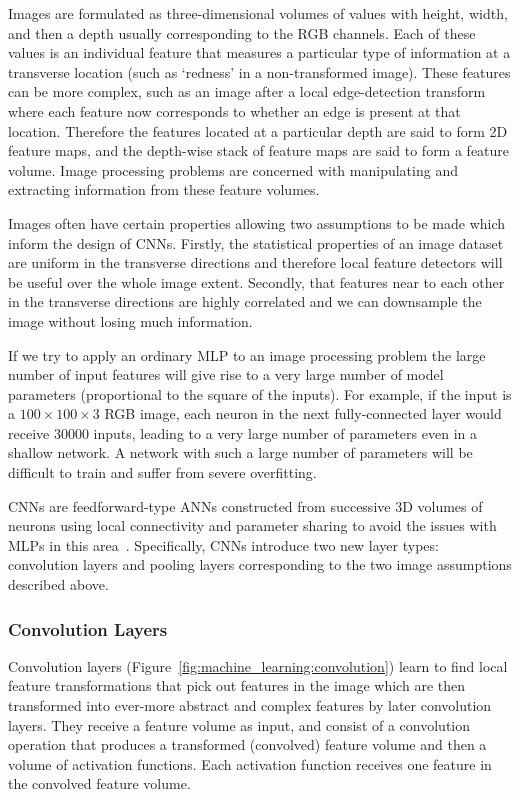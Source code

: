 Images are formulated as three-dimensional volumes of values with height, width, and then a depth usually corresponding to the RGB channels. 
Each of these values is an individual feature that measures a particular type of information at a transverse location (such as `redness' in a non-transformed image). 
These features can be more complex, such as an image after a local edge-detection transform where each feature now corresponds to whether an edge is present at that location. 
Therefore the features located at a particular depth are said to form 2D feature maps, and the depth-wise stack of feature maps are said to form a feature volume. 
Image processing problems are concerned with manipulating and extracting information from these feature volumes.

Images often have certain properties allowing two assumptions to be made which inform the design of CNNs. 
Firstly, the statistical properties of an image dataset are uniform in the transverse directions and therefore local feature detectors will be useful over the whole image extent. 
Secondly, that features near to each other in the transverse directions are highly correlated and we can downsample the image without losing much information. 


If we try to apply an ordinary MLP to an image processing problem the large number of input features will give rise to a very large number of model parameters (proportional to the square of the inputs). 
For example, if the input is a $100\times{}100\times{}3$ RGB image, each neuron in the next fully-connected layer would receive $30000$ inputs, leading to a very large number of parameters even in a shallow network. A network with such a large number of parameters will be difficult to train and suffer from severe overfitting.

CNNs are feedforward-type ANNs constructed from successive 3D volumes of neurons using local connectivity and parameter sharing to avoid the issues with MLPs in this area~\cite{CS231n}. Specifically, CNNs introduce two new layer types: convolution layers and pooling layers corresponding to the two image assumptions described above.



\subsubsection{Convolution Layers}
Convolution layers (Figure~\ref{fig:machine_learning:convolution}) learn to find local feature transformations that pick out features in the image which are then transformed into ever-more abstract and complex features by later convolution layers. 
They receive a feature volume as input, and consist of a convolution operation that produces a transformed (convolved) feature volume and then a volume of activation functions. 
Each activation function receives one feature in the convolved feature volume.  


